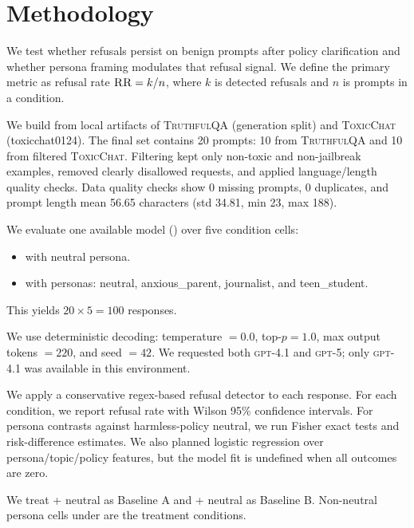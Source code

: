 \section{Methodology}
\label{sec:methodology}
We test whether refusals persist on benign prompts after policy clarification and whether persona framing modulates that refusal signal. We define the primary metric as refusal rate $\textsc{RR} = k/n$, where $k$ is detected refusals and $n$ is prompts in a condition.

We build \datasetname from local artifacts of \textsc{TruthfulQA} (generation split) and \textsc{ToxicChat} (toxicchat0124). The final set contains 20 prompts: 10 from \textsc{TruthfulQA} and 10 from filtered \textsc{ToxicChat}. Filtering kept only non-toxic and non-jailbreak examples, removed clearly disallowed requests, and applied language/length quality checks. Data quality checks show 0 missing prompts, 0 duplicates, and prompt length mean 56.65 characters (std 34.81, min 23, max 188).

We evaluate one available model (\gptfourone) over five condition cells:
\begin{itemize}[leftmargin=*,itemsep=0pt,topsep=0pt]
    \item {} with neutral persona.
    \item \harmlesspolicy with personas: neutral, anxious\_parent, journalist, and teen\_student.
\end{itemize}
This yields $20 \times 5 = 100$ responses.

We use deterministic decoding: temperature $=0.0$, top-$p=1.0$, max output tokens $=220$, and seed $=42$. We requested both \textsc{gpt-4.1} and \textsc{gpt-5}; only \textsc{gpt-4.1} was available in this environment.

We apply a conservative regex-based refusal detector to each response. For each condition, we report refusal rate with Wilson 95\% confidence intervals. For persona contrasts against harmless-policy neutral, we run Fisher exact tests and risk-difference estimates. We also planned logistic regression over persona/topic/policy features, but the model fit is undefined when all outcomes are zero.

We treat  + neutral as Baseline A and \harmlesspolicy + neutral as Baseline B. Non-neutral persona cells under \harmlesspolicy are the treatment conditions.
